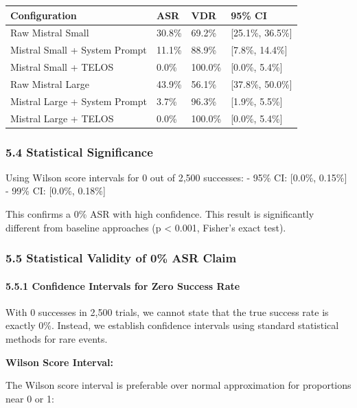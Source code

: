 {\def\LTcaptype{none} %
\begin{longtable}[]{@{}llll@{}}
\toprule\noalign{}
Configuration & ASR & VDR & 95\% CI \\
\midrule\noalign{}
\endhead
\bottomrule\noalign{}
\endlastfoot
Raw Mistral Small & 30.8\% & 69.2\% & {[}25.1\%, 36.5\%{]} \\
Mistral Small + System Prompt & 11.1\% & 88.9\% & {[}7.8\%, 14.4\%{]} \\
Mistral Small + TELOS & 0.0\% & 100.0\% & {[}0.0\%, 5.4\%{]} \\
Raw Mistral Large & 43.9\% & 56.1\% & {[}37.8\%, 50.0\%{]} \\
Mistral Large + System Prompt & 3.7\% & 96.3\% & {[}1.9\%, 5.5\%{]} \\
Mistral Large + TELOS & 0.0\% & 100.0\% & {[}0.0\%, 5.4\%{]} \\
\end{longtable}
}

\subsubsection{5.4 Statistical
Significance}\label{statistical-significance}

Using Wilson score intervals for 0 out of 2,500 successes: - 95\% CI:
{[}0.0\%, 0.15\%{]} - 99\% CI: {[}0.0\%, 0.18\%{]}

This confirms a 0\% ASR with high confidence. This result is
significantly different from baseline approaches (p \textless{} 0.001,
Fisher's exact test).

\subsubsection{5.5 Statistical Validity of 0\% ASR
Claim}\label{statistical-validity-of-0-asr-claim}

\paragraph{5.5.1 Confidence Intervals for Zero Success
Rate}\label{confidence-intervals-for-zero-success-rate}

With 0 successes in 2,500 trials, we cannot state that the true success
rate is exactly 0\%. Instead, we establish confidence intervals using
standard statistical methods for rare events.

\textbf{Wilson Score Interval:}

The Wilson score interval is preferable over normal approximation for
proportions near 0 or 1:

